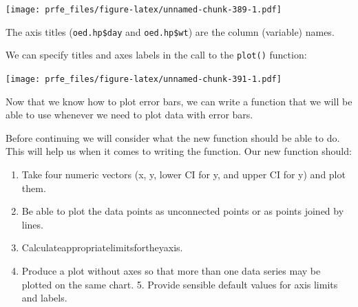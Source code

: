 \documentclass[12pt,a4paper]{book}
\newenvironment{Shaded}{\begin{snugshade}}{\end{snugshade}}
\newcommand{\KeywordTok}[1]{\textcolor[rgb]{0.13,0.29,0.53}{\textbf{#1}}}
\newcommand{\DataTypeTok}[1]{\textcolor[rgb]{0.13,0.29,0.53}{#1}}
\newcommand{\DecValTok}[1]{\textcolor[rgb]{0.00,0.00,0.81}{#1}}
\newcommand{\FloatTok}[1]{\textcolor[rgb]{0.00,0.00,0.81}{#1}}
\newcommand{\StringTok}[1]{\textcolor[rgb]{0.31,0.60,0.02}{#1}}
\newcommand{\OperatorTok}[1]{\textcolor[rgb]{0.81,0.36,0.00}{\textbf{#1}}}
\newcommand{\NormalTok}[1]{#1}
\theoremstyle{definition}
\theoremstyle{definition}
\theoremstyle{definition}
\theoremstyle{remark}
\begin{document}
\texttt{[image: prfe\_files/figure-latex/unnamed-chunk-389-1.pdf]}

The axis titles (\texttt{oed.hp\$day} and \texttt{oed.hp\$wt}) are the
column (variable) names.

We can specify titles and axes labels in the call to the \texttt{plot()}
function:

\begin{Shaded}
\end{Shaded}

\texttt{[image: prfe\_files/figure-latex/unnamed-chunk-391-1.pdf]}

Now that we know how to plot error bars, we can write a function that we
will be able to use whenever we need to plot data with error bars.

Before continuing we will consider what the new function should be able
to do. This will help us when it comes to writing the function. Our new
function should:

\begin{enumerate}
\def\labelenumi{\arabic{enumi}.}
\item
  Take four numeric vectors (x, y, lower CI for y, and upper CI for y)
  and plot them.
\item
  Be able to plot the data points as unconnected points or as points
  joined by lines.
\item
  Calculateappropriatelimitsfortheyaxis.
\item
  Produce a plot without axes so that more than one data series may be
  plotted on the same chart. 5. Provide sensible default values for axis
  limits and labels.
\end{enumerate}
\end{document}
